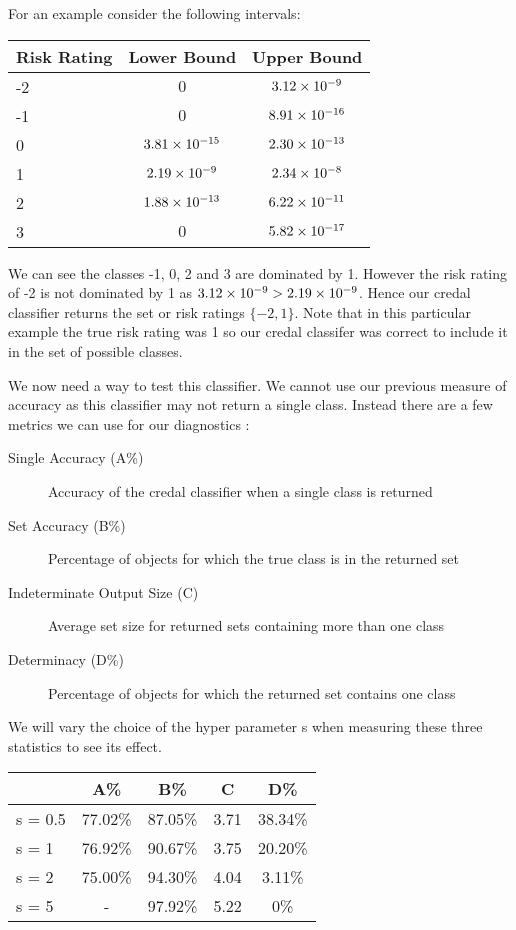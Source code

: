 For an example consider the following intervals:
\begin{center}
	\begin{tabular}{l|c c}
	Risk Rating & Lower Bound & Upper Bound \\
	\hline
	-2          & $0$              & ${3.12}\times 10^{-9}$  \\
	-1          & $0$              & ${8.91}\times 10^{-16}$ \\
	0           & ${3.81}\times 10^{-15}$ & ${2.30}\times 10^{-13}$ \\
	1           & ${2.19}\times 10^{-9}$  & ${2.34}\times 10^{-8}$  \\
	2           & ${1.88}\times 10^{-13}$ & ${6.22}\times 10^{-11}$ \\
	3           & $0$              & ${5.82}\times 10^{-17}$ \\
	\end{tabular}
\end{center}
We can see the classes -1, 0, 2 and 3 are dominated by 1.
However the risk rating of -2 is not dominated by 1 as ${3.12}\times 10^{-9} > {2.19}\times 10^{-9}$.
Hence our credal classifier returns the set or risk ratings $\{-2, 1\}$.
Note that in this particular example the true risk rating was 1 so our credal classifer was correct to include it in the set of possible classes.

We now need a way to test this classifier.
We cannot use our previous measure of accuracy as this classifier may not return a single class.
Instead there are a few metrics we can use for our diagnostics \cite{Antonucci11}:
\begin{description}
	\item[Single Accuracy (A\%)] Accuracy of the credal classifier when a single class is returned
	\item[Set Accuracy (B\%)] Percentage of objects for which the true class is in the returned set
	\item[Indeterminate Output Size (C)] Average set size for returned sets containing more than one class
	\item[Determinacy (D\%)] Percentage of objects for which the returned set contains one class
\end{description}

We will vary the choice of the hyper parameter s when measuring these three statistics to see its effect.
\begin{center}
\begin{tabular}{l|c c c c}
        & A\%     & B\%     & C    & D\%     \\
\hline
s = 0.5 & 77.02\% & 87.05\% & 3.71 & 38.34\% \\
s = 1   & 76.92\% & 90.67\% & 3.75 & 20.20\% \\
s = 2   & 75.00\% & 94.30\% & 4.04 & 3.11\% \\
s = 5   & -       & 97.92\% & 5.22 & 0\%   \\
\end{tabular}
\end{center}

